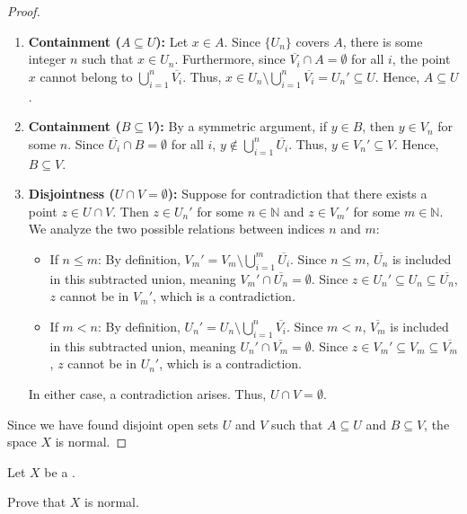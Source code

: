 \documentclass[11pt]{article}
\begin{document}
\begin{proof}
    \begin{enumerate}
        \item \textbf{Containment ($A \subseteq U$):} Let $x \in A$. Since $\{U_n\}$ covers $A$, there is some integer $n$ such that $x \in U_n$. Furthermore, since $\overline{V_i} \cap A = \emptyset$ for all $i$, the point $x$ cannot belong to $\bigcup_{i=1}^{n} \overline{V_i}$. Thus, $x \in U_n \setminus \bigcup_{i=1}^{n} \overline{V_i} = U_n' \subseteq U$. Hence, $A \subseteq U$.

        \item \textbf{Containment ($B \subseteq V$):} By a symmetric argument, if $y \in B$, then $y \in V_n$ for some $n$. Since $\overline{U_i} \cap B = \emptyset$ for all $i$, $y \notin \bigcup_{i=1}^{n} \overline{U_i}$. Thus, $y \in V_n' \subseteq V$. Hence, $B \subseteq V$.

        \item \textbf{Disjointness ($U \cap V = \emptyset$):} Suppose for contradiction that there exists a point $z \in U \cap V$. Then $z \in U_n'$ for some $n \in \mathbb{N}$ and $z \in V_m'$ for some $m \in \mathbb{N}$. We analyze the two possible relations between indices $n$ and $m$:
        \begin{itemize}
            \item If $n \le m$: By definition, $V_m' = V_m \setminus \bigcup_{i=1}^{m} \overline{U_i}$. Since $n \le m$, $\overline{U_n}$ is included in this subtracted union, meaning $V_m' \cap \overline{U_n} = \emptyset$. Since $z \in U_n' \subseteq U_n \subseteq \overline{U_n}$, $z$ cannot be in $V_m'$, which is a contradiction.
            \item If $m < n$: By definition, $U_n' = U_n \setminus \bigcup_{i=1}^{n} \overline{V_i}$. Since $m < n$, $\overline{V_m}$ is included in this subtracted union, meaning $U_n' \cap \overline{V_m} = \emptyset$. Since $z \in V_m' \subseteq V_m \subseteq \overline{V_m}$, $z$ cannot be in $U_n'$, which is a contradiction.
        \end{itemize}
        In either case, a contradiction arises. Thus, $U \cap V = \emptyset$.
    \end{enumerate}

    Since we have found disjoint open sets $U$ and $V$ such that $A \subseteq U$ and $B \subseteq V$, the space $X$ is normal.
\end{proof}

\begin{prob}
    Let $X$ be a . 

    Prove that $X$ is normal. 
\end{prob}
\end{document}
